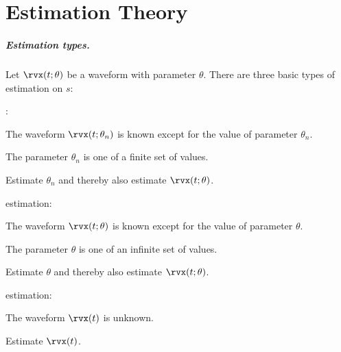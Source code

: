 
\chapter{Estimation Theory }
\label{app:est}
\paragraph{Estimation types.}
Let $\rvx(t;\theta)$ be a waveform with parameter $\theta$.
There are three basic types of estimation on $s$:

\begin{enume}
   \item {}:
      \begin{liste}
         \item The waveform $\rvx(t;\theta_n)$ is known except for the value of parameter $\theta_n$.
         \item The parameter $\theta_n$ is one of a finite set of values.
         \item Estimate $\theta_n$ and thereby also estimate $\rvx(t;\theta)$.
      \end{liste}
   \item {} estimation:
      \begin{liste}
         \item The waveform $\rvx(t;\theta)$ is known except for the value of parameter $\theta$.
         \item The parameter $\theta$ is one of an infinite set of values.
         \item Estimate $\theta$ and thereby also estimate $\rvx(t;\theta)$.
      \end{liste}
   \item {} estimation:
      \begin{liste}
         \item The waveform $\rvx(t)$ is unknown.
         \item Estimate $\rvx(t)$.
      \end{liste}
\end{enume}


